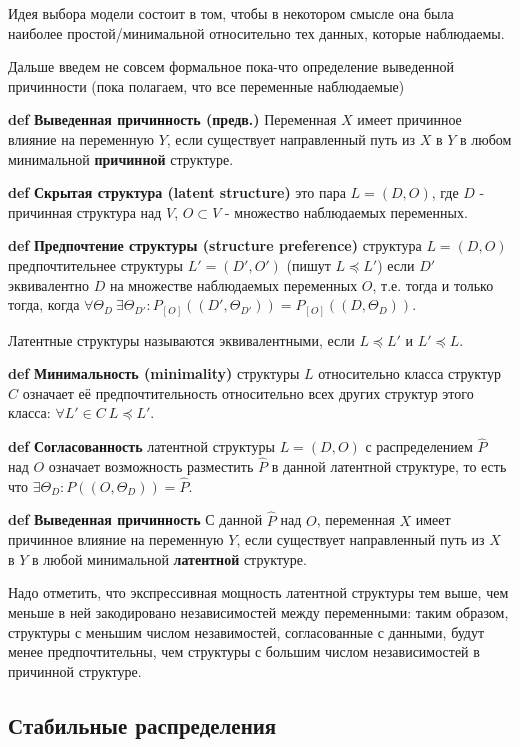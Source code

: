 \documentclass[fleqn]{article}
\def\define#1{\textbf{def} \textbf{#1}}
\begin{document}
Идея выбора модели состоит в том, чтобы в некотором смысле она была наиболее простой/минимальной относительно тех данных, которые наблюдаемы.

Дальше введем не совсем формальное пока-что определение выведенной причинности (пока полагаем, что все переменные наблюдаемые)

\define{Выведенная причинность (предв.)} Переменная $X$ имеет причинное влияние на переменную $Y$, если существует направленный путь из $X$ в $Y$ в любом минимальной \textbf{причинной} структуре.

\define{Скрытая структура (latent structure)} это пара $L = (D, O)$, где $D$ - причинная структура над $V$, $O \subset V$ - множество наблюдаемых переменных.

\define{Предпочтение структуры (structure preference)} структура $L = (D, O)$ предпочтительнее структуры $L' = (D', O')$ (пишут $L \preceq L'$) если $D'$ эквивалентно $D$ на множестве наблюдаемых переменных $O$, т.е. тогда и только тогда, когда  $\forall \Theta_D \  \exists \Theta_{D'} : P_{[O]}((D', \Theta_{D'})) = P_{[O]}((D, \Theta_{D}))$. 

Латентные структуры называются эквивалентными, если $L \preceq L'$ и $L' \preceq L$. 

\define{Минимальность (minimality)} структуры $L$ относительно класса структур $C$ означает её предпочтительность относительно всех других структур этого класса: $\forall L' \in C \ L \preceq L'$.

\define{Согласованность} латентной структуры $L = (D, O)$ с распределением $\hat P$ над $O$ означает возможность разместить $\hat P$ в данной латентной структуре, то есть что $\exists \Theta_D : P((O, \Theta_D)) = \hat P$.


\define{Выведенная причинность} С данной $\hat P$ над $O$, переменная $X$ имеет причинное влияние на переменную $Y$, если существует направленный путь из $X$ в $Y$ в любой минимальной \textbf{латентной} структуре.

Надо отметить, что экспрессивная мощность латентной структуры тем выше, чем меньше в ней закодировано независимостей между переменными: таким образом, структуры с меньшим числом незавимостей, согласованные с данными, будут менее предпочтительны, чем структуры с большим числом независимостей в причинной структуре.

\subsection*{Стабильные распределения}
\end{document}
